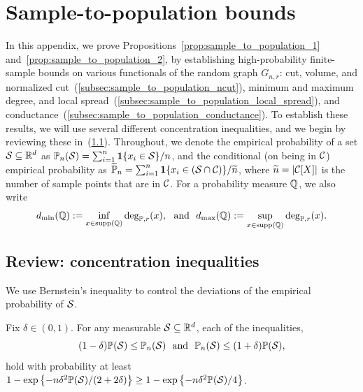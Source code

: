 \section{Sample-to-population bounds}
\label{apdx:sample_to_population}
In this appendix, we prove Propositions~\ref{prop:sample_to_population_1} and~\ref{prop:sample_to_population_2}, by establishing high-probability finite-sample bounds on various functionals of the random graph $G_{n,r}$: cut, volume, and normalized cut~(\ref{subsec:sample_to_population_ncut}), minimum and maximum degree, and local spread~(\ref{subsec:sample_to_population_local_spread}), and conductance~(\ref{subsec:sample_to_population_conductance}). To establish these results, we will use several different concentration inequalities, and we begin by reviewing these in~(\ref{subsec:concentration}). Throughout, we denote the empirical probability of a set $\mathcal{S} \subseteq \mathbb{R}^d$ as $\mathbb{P}_n(\mathcal{S}) = \sum_{i = 1}^{n} \mathbf{1}\{x_i \in \mathcal{S}\}/n$, and the conditional (on being in $\mathcal{C}$) empirical probability as $\widetilde{\mathbb{P}}_n = \sum_{i = 1}^{n} \mathbf{1}\{x_i \in (\mathcal{S} \cap \mathcal{C})\}/\widetilde{n}$, where $\widetilde{n} = |\mathcal{C}[X]|$ is the number of sample points that are in $\mathcal{C}$. For a probability measure $\mathbb{Q}$, we also write
\begin{equation}
\label{eqn:population_minmax_degree}
d_{\min}(\mathbb{Q}) := \inf_{x \in \mathrm{supp}(\mathbb{Q})} \deg_{\mathbb{P},r}(x),~~\textrm{and}~~d_{\max}(\mathbb{Q}) := \sup_{x \in \mathrm{supp}(\mathbb{Q})} \deg_{\mathbb{P},r}(x).
\end{equation}

\subsection{Review: concentration inequalities}
\label{subsec:concentration}
We use Bernstein's inequality to control the deviations of the empirical probability of $\mathcal{S}$.
\begin{lemma}
	\label{lem:hoeffding_2}
	Fix $\delta \in (0,1)$. For any measurable $\mathcal{S} \subseteq \mathbb{R}^d$, each of the inequalities,
	\begin{equation*}
	(1 - \delta) \mathbb{P}(\mathcal{S}) \leq \mathbb{P}_n(\mathcal{S})~~\textrm{and}~~\mathbb{P}_n(\mathcal{S}) \leq (1 + \delta)\mathbb{P}(\mathcal{S}),
	\end{equation*}
	hold with probability at least $1 - \exp\left\{-n\delta^2\mathbb{P}(\mathcal{S})/(2 + 2\delta)\right\} \geq 1 - \exp\left\{-n\delta^2\mathbb{P}(\mathcal{S})/4\right\}$. 
\end{lemma}

